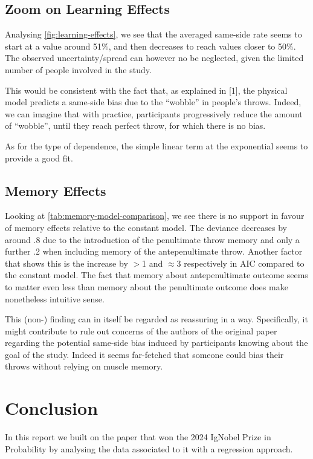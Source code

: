 \documentclass[a4paper, 12pt,oneside]{article}
\begin{document}
		\subsection{Zoom on Learning Effects}\label{sec:disc-learning-effects}
			Analysing \ref{fig:learning-effects}, we see that the averaged same-side rate seems to start at a value around 51\%, and then decreases to reach values closer to 50\%. The observed uncertainty/spread can however no be neglected, given the limited number of people involved in the study. 
			
			This would be consistent with the fact that, as explained in [1], the physical model predicts a same-side bias due to the ``wobble'' in people's throws. Indeed, we can imagine that with practice, participants progressively reduce the amount of ``wobble'', until they reach perfect throw, for which there is no bias. 

			As for the type of dependence, the simple linear term at the exponential seems to provide a good fit.  
		\subsection{Memory Effects}
		Looking at \ref{tab:memory-model-comparison}, we see there is no support in favour of memory effects relative to the constant model. The deviance decreases by around .8 due to the introduction of the penultimate throw memory and only a further .2 when including memory of the antepenultimate throw. Another factor that shows this is the increase by $>$1 and $\approx 3$ respectively in AIC compared to the constant model.
		The fact that memory about antepenultimate outcome seems to matter even less than memory about the penultimate outcome does make nonetheless intuitive sense. 

		This (non-) finding can in itself be regarded as reassuring in a way. Specifically, it might contribute to rule out concerns of the authors of the original paper regarding the potential same-side bias induced by participants knowing about the goal of the study. Indeed it seems far-fetched that someone could bias their throws without relying on muscle memory. 
	\section{Conclusion}
		In this report we built on the paper that won the 2024 IgNobel Prize in Probability by analysing the data associated to it with a regression approach. 
		
\end{document}
